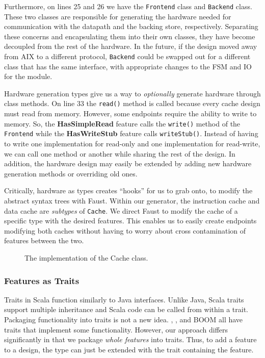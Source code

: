 \documentclass[conference]{IEEEtran}
\begin{document}
Furthermore, on lines 25 and 26 we have the \texttt{Frontend} class and \texttt{Backend} class. These two classes are responsible for generating the hardware needed for communication with the datapath and the backing store, respectively. Separating these concerns and encapsulating them into their own classes, they have become decoupled from the rest of the hardware. In the future, if the design moved away from AIX to a different protocol, \texttt{Backend} could be swapped out for a different class that has the same interface, with appropriate changes to the FSM and IO for the module.

Hardware generation types give us a way to \emph{optionally} generate hardware through class methods. On line 33 the \texttt{read()} method is called because every cache design must read from memory. However, some endpoints require the ability to write to memory. So, the \textbf{HasSimpleRead} feature calls the \texttt{write()} method of the \texttt{Frontend} while the \textbf{HasWriteStub} feature calls \texttt{writeStub()}. Instead of having to write one implementation for read-only and one implementation for read-write, we can call one method or another while sharing the rest of the design. In addition, the hardware design may easily be extended by adding new hardware generation methods or overriding old ones.

Critically, hardware as types creates ``hooks'' for us to grab onto, to modify the abstract syntax trees with Faust. Within our generator, the instruction cache and data cache are \emph{subtypes} of \texttt{Cache}. We direct Faust to modify the cache of a specific type with the desired features. This enables us to easily create endpoints modifying both caches without having to worry about cross contamination of features between the two.
\begin{figure}[ht]
    \centering
    
    \caption{The implementation of the Cache class.}
    \label{lst:BaseSystem}
\end{figure}

\subsubsection{Features as Traits}
Traits in Scala function similarly to Java interfaces. Unlike Java, Scala traits support multiple inheritance and Scala code can be called from within a trait. Packaging functionality into traits is not a new idea. \Riscvmini{}, \Rocketchip{}, and BOOM all have traits that implement some functionality. However, our approach differs significantly in that we package \emph{whole features} into traits. Thus, to add a feature to a design, the type can just be extended with the trait containing the feature.
\end{document}
